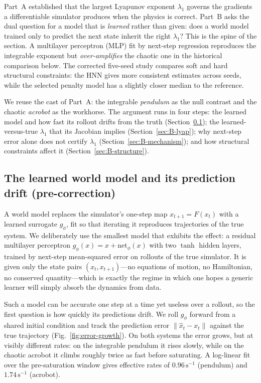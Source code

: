 \documentclass[11pt]{article}
\newcommand{\norm}[1]{\left\lVert #1 \right\rVert}
\begin{document}
Part~A established that the largest Lyapunov exponent $\lambda_1$ governs the gradients a
differentiable simulator produces when the physics is correct. Part~B asks the dual question for a
model that is \emph{learned} rather than given: does a world model trained only to predict the next
state inherit the right $\lambda_1$? This is the spine of the section. A multilayer perceptron (MLP) fit by
next-step regression reproduces the integrable exponent but \emph{over-amplifies} the chaotic
one in the historical comparison below. The corrected five-seed study compares soft and hard
structural constraints: the HNN gives more consistent estimates across seeds, while the selected
penalty model has a slightly closer median to the reference.

We reuse the cast of Part~A: the integrable \emph{pendulum} as the null contrast and the chaotic
\emph{acrobot} as the workhorse.
The argument runs in four steps: the learned model and how fast its rollout drifts from the truth
(Section~\ref{sec:B-model}); the learned-versus-true $\lambda_1$ that its Jacobian implies
(Section~\ref{sec:B-lyap}); why next-step error alone does not certify $\lambda_1$
(Section~\ref{sec:B-mechanism}); and how structural constraints affect it
(Section~\ref{sec:B-structure}).

\subsection{The learned world model and its prediction drift (pre-correction)}\label{sec:B-model}

A world model replaces the simulator's one-step map $x_{t+1}=F(x_t)$ with a learned surrogate
$g_\phi$, fit so that iterating it reproduces trajectories of the true system. We deliberately use the
smallest model that exhibits the effect: a residual multilayer perceptron
$g_\phi(x)=x+\mathrm{net}_\phi(x)$ with two $\tanh$ hidden layers, trained by next-step mean-squared
error on rollouts of the true simulator. It is given only the state pairs $(x_t,x_{t+1})$---no
equations of motion, no Hamiltonian, no conserved quantity---which is exactly the regime in which one
hopes a generic learner will simply absorb the dynamics from data.

Such a model can be accurate one step at a time yet useless over a rollout, so the first question is
how quickly its predictions drift. We roll $g_\phi$ forward from a shared initial condition and track
the prediction error $\norm{\hat x_t - x_t}$ against the true trajectory (Fig.~\ref{fig:error-growth}).
On both systems the error grows, but at visibly different rates: on the integrable pendulum it rises
slowly, while on the chaotic acrobot it climbs roughly twice as fast before saturating. A log-linear
fit over the pre-saturation window gives effective rates of $0.96\,\mathrm{s}^{-1}$ (pendulum) and
$1.74\,\mathrm{s}^{-1}$ (acrobot).
\end{document}
